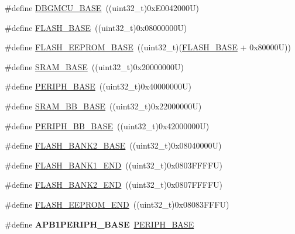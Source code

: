 \begin{DoxyCompactItemize}
\item 
\#define \hyperlink{group___peripheral__memory__map_ga4adaf4fd82ccc3a538f1f27a70cdbbef}{D\-B\-G\-M\-C\-U\-\_\-\-B\-A\-S\-E}~((uint32\-\_\-t)0x\-E0042000\-U)
\item 
\#define \hyperlink{group___peripheral__memory__map_ga23a9099a5f8fc9c6e253c0eecb2be8db}{F\-L\-A\-S\-H\-\_\-\-B\-A\-S\-E}~((uint32\-\_\-t)0x08000000\-U)
\item 
\#define \hyperlink{group___peripheral__memory__map_ga45b9071c81cb72a66e2e3195343fcb3a}{F\-L\-A\-S\-H\-\_\-\-E\-E\-P\-R\-O\-M\-\_\-\-B\-A\-S\-E}~((uint32\-\_\-t)(\hyperlink{group___peripheral__memory__map_ga23a9099a5f8fc9c6e253c0eecb2be8db}{F\-L\-A\-S\-H\-\_\-\-B\-A\-S\-E} + 0x80000\-U))
\item 
\#define \hyperlink{group___peripheral__memory__map_ga05e8f3d2e5868754a7cd88614955aecc}{S\-R\-A\-M\-\_\-\-B\-A\-S\-E}~((uint32\-\_\-t)0x20000000\-U)
\item 
\#define \hyperlink{group___peripheral__memory__map_ga9171f49478fa86d932f89e78e73b88b0}{P\-E\-R\-I\-P\-H\-\_\-\-B\-A\-S\-E}~((uint32\-\_\-t)0x40000000\-U)
\item 
\#define \hyperlink{group___peripheral__memory__map_gad3548b6e2f017f39d399358f3ac98454}{S\-R\-A\-M\-\_\-\-B\-B\-\_\-\-B\-A\-S\-E}~((uint32\-\_\-t)0x22000000\-U)
\item 
\#define \hyperlink{group___peripheral__memory__map_gaed7efc100877000845c236ccdc9e144a}{P\-E\-R\-I\-P\-H\-\_\-\-B\-B\-\_\-\-B\-A\-S\-E}~((uint32\-\_\-t)0x42000000\-U)
\item 
\#define \hyperlink{group___peripheral__memory__map_ga289057b052162696849fef25b656d3d9}{F\-L\-A\-S\-H\-\_\-\-B\-A\-N\-K2\-\_\-\-B\-A\-S\-E}~((uint32\-\_\-t)0x08040000\-U)
\item 
\#define \hyperlink{group___peripheral__memory__map_ga443a2786535d83e32dfdc2b29e379332}{F\-L\-A\-S\-H\-\_\-\-B\-A\-N\-K1\-\_\-\-E\-N\-D}~((uint32\-\_\-t)0x0803\-F\-F\-F\-F\-U)
\item 
\#define \hyperlink{group___peripheral__memory__map_gab24a21b645aaab8737af5603c3d11e71}{F\-L\-A\-S\-H\-\_\-\-B\-A\-N\-K2\-\_\-\-E\-N\-D}~((uint32\-\_\-t)0x0807\-F\-F\-F\-F\-U)
\item 
\#define \hyperlink{group___peripheral__memory__map_gac8cb9b66893a7c4bdff3258909af027a}{F\-L\-A\-S\-H\-\_\-\-E\-E\-P\-R\-O\-M\-\_\-\-E\-N\-D}~((uint32\-\_\-t)0x08083\-F\-F\-F\-U)
\item 
\hypertarget{group___peripheral__memory__map_ga45666d911f39addd4c8c0a0ac3388cfb}{\#define {\bfseries A\-P\-B1\-P\-E\-R\-I\-P\-H\-\_\-\-B\-A\-S\-E}~\hyperlink{group___peripheral__memory__map_ga9171f49478fa86d932f89e78e73b88b0}{P\-E\-R\-I\-P\-H\-\_\-\-B\-A\-S\-E}}\label{group___peripheral__memory__map_ga45666d911f39addd4c8c0a0ac3388cfb}


\end{DoxyCompactItemize}
